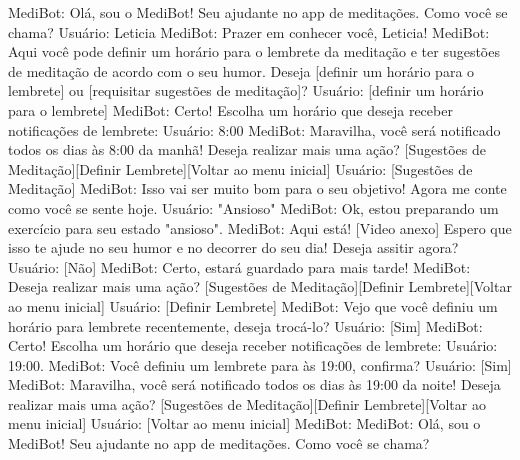 MediBot: Olá, sou o MediBot! Seu ajudante no app de meditações. Como você se chama?
Usuário: Leticia
MediBot: Prazer em conhecer você, Leticia!
MediBot: Aqui você pode definir um horário para o lembrete da meditação
        e ter sugestões de meditação de acordo com o seu humor. Deseja [definir um horário para o lembrete]
        ou [requisitar sugestões de meditação]?
Usuário: [definir um horário para o lembrete]
MediBot: Certo! Escolha um horário que deseja receber notificações de lembrete:
Usuário: 8:00
MediBot: Maravilha, você será notificado todos os dias às 8:00 da manhã! Deseja realizar mais uma ação? 
        [Sugestões de Meditação][Definir Lembrete][Voltar ao menu inicial]
Usuário: [Sugestões de Meditação]
MediBot: Isso vai ser muito bom para o seu objetivo! Agora me conte como você se sente hoje.
Usuário: "Ansioso"
MediBot: Ok, estou preparando um exercício para seu estado "ansioso". 
MediBot: Aqui está! [Video anexo] Espero que isso te ajude no seu humor e no decorrer do seu dia! Deseja assitir agora?
Usuário: [Não]
MediBot: Certo, estará guardado para mais tarde!
MediBot: Deseja realizar mais uma ação? 
        [Sugestões de Meditação][Definir Lembrete][Voltar ao menu inicial]
Usuário: [Definir Lembrete]
MediBot: Vejo que você definiu um horário para lembrete recentemente, deseja trocá-lo?
Usuário: [Sim]
MediBot: Certo! Escolha um horário que deseja receber notificações de lembrete:
Usuário: 19:00.
MediBot: Você definiu um lembrete para às 19:00, confirma?
Usuário: [Sim]
MediBot: Maravilha, você será notificado todos os dias às 19:00 da noite! Deseja realizar mais uma ação? 
        [Sugestões de Meditação][Definir Lembrete][Voltar ao menu inicial]
Usuário: [Voltar ao menu inicial]
MediBot: MediBot: Olá, sou o MediBot! Seu ajudante no app de meditações. Como você se chama?